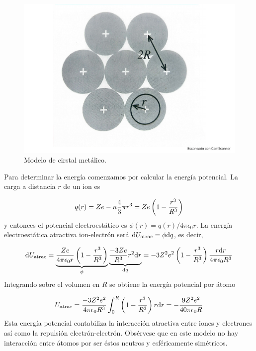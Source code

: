 \begin{figure}[h!] \centering
    \includegraphics[scale=0.5]{Cuerpo/Ch_03/Fotos libro 9.pdf}
    \caption{Modelo de cirstal metálico.}
    \label{Fig:03-10}
\end{figure}    


Para determinar la energía comenzamos por calcular la energía potencial. La carga a distancia $r$ de un ion es

\begin{equation}
    q(r) = Ze - n \frac{4}{3} \pi r^3 = Ze \left( 1-\frac{r ^3}{R^3} \right)
\end{equation}
y entonces el potencial electroestático es $\phi(r) = q(r)/4\pi \epsilon_0 r$. La energía electroestática atractiva ion-electrón será $\mathrm{d} U_{\text{atrac}} = \phi \mathrm{d} q$, es decir,

\begin{equation}
    \mathrm{d} U_{\text{atrac}} = \underbrace{\frac{Ze}{4 \pi \epsilon_0 r} \left( 1-\frac{r^3}{R^3} \right)}_{\phi} \underbrace{\frac{-3Ze}{R^3}r^2 \mathrm{d} r}_{\mathrm{d} q} = -3Z^2 e^2 \left( 1-\frac{r^3}{R^3} \right) \frac{r\mathrm{d} r}{4 \pi \epsilon_0 R^3}
\end{equation}
Integrando sobre el volumen en $R$ se obtiene la energía potencial por átomo

\begin{equation}
    U_{\text{atrac}} = \frac{-3Z^2e^2}{4 \pi \epsilon_0 R^3} \int_0^R \left( 1-\frac{r^3}{R^3} \right) r \mathrm{d} r = - \frac{9Z^2 e^2}{40 \pi \epsilon_0 R}
\end{equation}
Esta energía potencial contabiliza la interacción atractiva entre iones y electrones así como la repulsión electrón-electrón. Obsérvese que en este modelo no hay interacción entre átomos por ser éstos neutros y esféricamente simétricos. 

